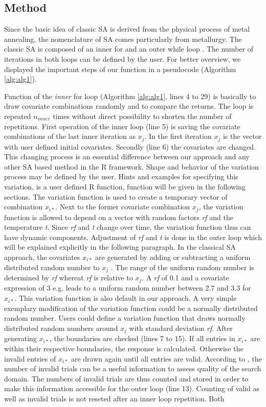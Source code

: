 \subsection{Method}
\label{subsec:method}
Since the basic idea of classic SA is derived from the physical process of metal annealing, the nomenclature of SA comes particularly from metallurgy. The classic SA is composed of an inner for and an outer while loop \citep{kirkpatrick_1983}. The number of iterations in both loops can be defined by the user. For better overview, we displayed the important steps of our function in a pseudocode (Algorithm \ref{alg:alg1}).

Function of the \emph{inner} for loop (Algorithm \ref{alg:alg1}, lines 4 to 29) is basically to draw covariate combinations randomly and to compare the returns. The loop is repeated $n_{inner}$ times without direct possibility to shorten the number of repetitions. First operation of the inner loop (line 5) is saving the covariate combinations of the last inner iteration as $x_j$. In the first iteration $x_j$ is the vector with user defined initial covariates. Secondly (line 6) the covariates are changed. This changing process is an essential difference between our approach and any other SA based method in the R framework. Shape and behavior of the variation process may be defined by the user. Hints and examples for specifying this variation, is a user defined R function, function will be given in the following sections. The variation function is used to create a temporary vector of combination $x_{i*}$. Next to the former covariate combination $x_j$, the variation function is allowed to depend on a vector with random factors \textit{rf} and the temperature \textit{t}. Since \textit{rf} and \textit{t} change over time, the variation function thus can have dynamic components. Adjustment of \textit{rf} and \textit{t} is done in the outer loop which will be explained explicitly in the following paragraph. In the classical SA approach, the covariates $x_{i*}$ are generated by adding or subtracting a uniform distributed random number to $x_j$ \citep{kirkpatrick_1983}. The range of the uniform random number is determined by \textit{rf} whereat \textit{rf} is relative to $x_j$. A \textit{rf} of 0.1 and a covariate expression of 3 e.g. leads to a uniform random number between 2.7 and 3.3 for $x_{i*}$. This variation function is also default in our approach. A very simple exemplary modification of the variation function could be a normally distributed random number. Users could define a variation function that draws normally distributed random numbers around $x_j$ with standard deviation \textit{rf}. After generating $x_{i*}$, the boundaries are checked (lines 7 to 15). If all entries in $x_{i*}$ are within their respective boundaries, the response is calculated. Otherwise the invalid entries of $x_{i*}$ are drawn again until all entries are valid. According to \citet{corana_1987}, the number of invalid trials can be a useful information to assess quality of the search domain. The numbers of invalid trials are thus counted and stored in order to make this information accessible for the outer loop (line 13). Counting of valid as well as invalid trials is not reseted after an inner loop repetition. Both 